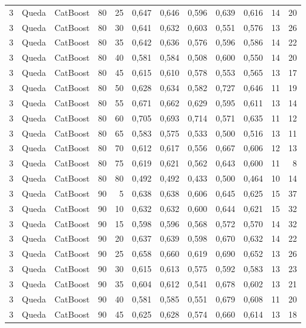 \begin{longtable}{@{}rllrrrrrrrrr@{}}
3 & Queda & CatBoost & 80 & 25 & 0,647 & 0,646 & 0,596 & 0,639 & 0,616 & 14 & 20 \\
3 & Queda & CatBoost & 80 & 30 & 0,641 & 0,632 & 0,603 & 0,551 & 0,576 & 13 & 26 \\
3 & Queda & CatBoost & 80 & 35 & 0,642 & 0,636 & 0,576 & 0,596 & 0,586 & 14 & 22 \\
3 & Queda & CatBoost & 80 & 40 & 0,581 & 0,584 & 0,508 & 0,600 & 0,550 & 14 & 20 \\
3 & Queda & CatBoost & 80 & 45 & 0,615 & 0,610 & 0,578 & 0,553 & 0,565 & 13 & 17 \\
3 & Queda & CatBoost & 80 & 50 & 0,628 & 0,634 & 0,582 & 0,727 & 0,646 & 11 & 19 \\
3 & Queda & CatBoost & 80 & 55 & 0,671 & 0,662 & 0,629 & 0,595 & 0,611 & 13 & 14 \\
3 & Queda & CatBoost & 80 & 60 & 0,705 & 0,693 & 0,714 & 0,571 & 0,635 & 11 & 12 \\
3 & Queda & CatBoost & 80 & 65 & 0,583 & 0,575 & 0,533 & 0,500 & 0,516 & 13 & 11 \\
3 & Queda & CatBoost & 80 & 70 & 0,612 & 0,617 & 0,556 & 0,667 & 0,606 & 12 & 13 \\
3 & Queda & CatBoost & 80 & 75 & 0,619 & 0,621 & 0,562 & 0,643 & 0,600 & 11 & 8 \\
3 & Queda & CatBoost & 80 & 80 & 0,492 & 0,492 & 0,433 & 0,500 & 0,464 & 10 & 14 \\
3 & Queda & CatBoost & 90 & 5 & 0,638 & 0,638 & 0,606 & 0,645 & 0,625 & 15 & 37 \\
3 & Queda & CatBoost & 90 & 10 & 0,632 & 0,632 & 0,600 & 0,644 & 0,621 & 15 & 32 \\
3 & Queda & CatBoost & 90 & 15 & 0,598 & 0,596 & 0,568 & 0,572 & 0,570 & 14 & 32 \\
3 & Queda & CatBoost & 90 & 20 & 0,637 & 0,639 & 0,598 & 0,670 & 0,632 & 14 & 22 \\
3 & Queda & CatBoost & 90 & 25 & 0,658 & 0,660 & 0,619 & 0,690 & 0,652 & 13 & 26 \\
3 & Queda & CatBoost & 90 & 30 & 0,615 & 0,613 & 0,575 & 0,592 & 0,583 & 13 & 23 \\
3 & Queda & CatBoost & 90 & 35 & 0,604 & 0,612 & 0,541 & 0,678 & 0,602 & 13 & 21 \\
3 & Queda & CatBoost & 90 & 40 & 0,581 & 0,585 & 0,551 & 0,679 & 0,608 & 11 & 20 \\
3 & Queda & CatBoost & 90 & 45 & 0,625 & 0,628 & 0,574 & 0,660 & 0,614 & 13 & 18 \\

\end{longtable}
